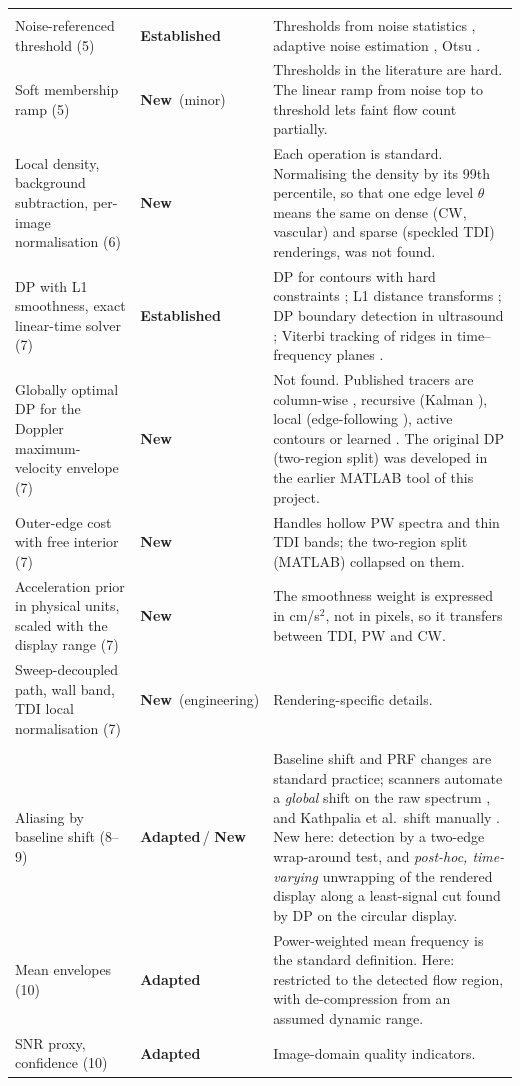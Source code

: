 \documentclass[10pt,a4paper]{article}
\newcommand{\est}{\textcolor{gray!75!black}{\textbf{Established}}}
\newcommand{\adp}{\textcolor{orange!80!black}{\textbf{Adapted}}}
\newcommand{\new}{\textcolor{green!45!black}{\textbf{New}}}
\begin{document}
\begin{table}[!htbp]
\begin{tabularx}{\linewidth}{@{}>{\raggedright\arraybackslash}p{3.3cm}>{\raggedright\arraybackslash}p{1.9cm}L@{}}
\midrule
{} \\
Noise-referenced threshold (5) & \est & Thresholds from noise statistics \cite{dalessio}, adaptive noise estimation \cite{kathpalia}, Otsu \cite{otsu}. \\
Soft membership ramp (5) & \new\ (minor) & Thresholds in the literature are hard. The linear ramp from noise top to threshold lets faint flow count partially. \\
Local density, background subtraction, per-image normalisation (6) & \new & Each operation is standard. Normalising the density by its
99th percentile, so that one edge level $\theta$ means the same on dense (CW, vascular) and sparse (speckled TDI) renderings, was not found. \\
DP with L1 smoothness, exact linear-time solver (7) & \est & DP for contours with hard constraints \cite{amini}; L1 distance transforms \cite{felzenszwalb};
DP boundary detection in ultrasound \cite{liang2000}; Viterbi tracking of ridges in time--frequency planes \cite{viterbiif}. \\
Globally optimal DP for the Doppler maximum-velocity envelope (7) & \new & Not found. Published tracers are column-wise
\cite{dalessio,kathpalia,li,zolgharni,latham}, recursive (Kalman \cite{wang2008}), local (edge-following \cite{tcd2020}), active contours
\cite{zamzmi} or learned \cite{mitralunet,lane2023,echonetmeas}. The original DP (two-region split) was developed in the earlier MATLAB tool of this project. \\
Outer-edge cost with free interior (7) & \new & Handles hollow PW spectra and thin TDI bands; the two-region split (MATLAB) collapsed on them. \\
Acceleration prior in physical units, scaled with the display range (7) & \new & The smoothness weight is expressed in cm/s$^2$, not in pixels, so it transfers between TDI, PW and CW. \\
Sweep-decoupled path, wall band, TDI local normalisation (7) & \new\ (engineering) & Rendering-specific details. \\
\midrule
{} \\
Aliasing by baseline shift (8--9) & \adp\,/ \new & Baseline shift and PRF changes are standard practice; scanners automate a \emph{global} shift on the
raw spectrum \cite{patautobaseline}, and Kathpalia et al.\ shift manually \cite{kathpalia}. New here: detection by a two-edge wrap-around test,
and \emph{post-hoc, time-varying} unwrapping of the rendered display along a least-signal cut found by DP on the circular display. \\
Mean envelopes (10) & \adp & Power-weighted mean frequency is the standard definition. Here: restricted to the detected flow region, with
de-compression from an assumed dynamic range. \\
SNR proxy, confidence (10) & \adp & Image-domain quality indicators. \\
\bottomrule
\end{tabularx}
\end{table}
\end{document}
